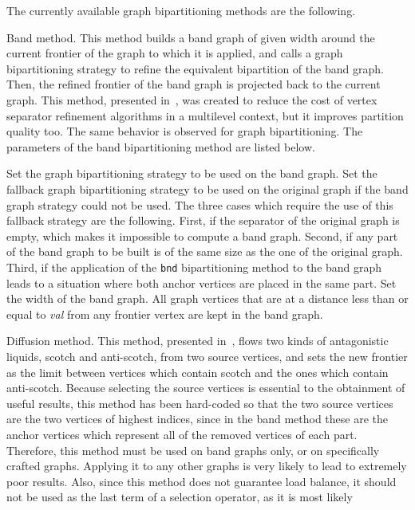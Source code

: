The currently available graph bipartitioning methods are the following.
\begin{itemize}
\iteme[{\tt b}]
Band method. This method builds a band graph of given width around the
current frontier of the graph to which it is applied, and
calls a graph bipartitioning strategy to refine the equivalent
bipartition of the band graph. Then, the refined frontier of the band
graph is projected back to the current graph. This method, presented
in~\cite{chpe06a}, was created to reduce the cost of vertex separator
refinement algorithms in a multilevel context, but it improves
partition quality too. The same behavior is observed for graph
bipartitioning. The parameters of the band bipartitioning method are
listed below.
\begin{itemize}
\iteme[{\tt bnd=}{\it strat}]
Set the graph bipartitioning strategy to be used on the band graph.
\iteme[{\tt org=}{\it strat}]
Set the fallback graph bipartitioning strategy to be used on the
original graph if the band graph strategy could not be used. The three
cases which require the use of this fallback strategy are the
following. First, if the separator of the original graph is empty,
which makes it impossible to compute a band graph. Second, if any part
of the band graph to be built is of the same size as the one of the
original graph. Third, if the application of the {\tt bnd}
bipartitioning method to the band graph leads to a situation where both
anchor vertices are placed in the same part.
\iteme[{\tt width=}{\it val}]
Set the width of the band graph. All graph vertices that are at a
distance less than or equal to {\it val} from any frontier vertex
are kept in the band graph.
\end{itemize}
\iteme[{\tt d}]
Diffusion method. This method, presented in~\cite{pell07b}, flows two
kinds of antagonistic liquids, scotch and anti-scotch, from two source
vertices, and sets the new frontier as the limit between vertices
which contain scotch and the ones which contain anti-scotch. Because
selecting the source vertices is essential to the obtainment of useful
results, this method has been hard-coded so that the two source
vertices are the two vertices of highest indices, since in the band
method these are the anchor vertices which represent all of the removed
vertices of each part. Therefore, this method must be used on band
graphs only, or on specifically crafted graphs. Applying it to any
other graphs is very likely to lead to extremely poor results.
Also, since this method does not guarantee load balance, it should not
be used as the last term of a selection operator, as it is most likely

\end{itemize}
